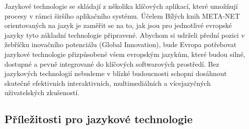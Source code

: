 \documentclass[]{../../metanetpaper}
\begin{document}
\begin{multicols}{2}
Jazykové technologie se skládají z několika klíčových aplikací, které umožňují procesy v rámci širšího aplikačního systému. Účelem Bílých knih META-NET orientovaných na jazyk je zaměřit se na to, jak jsou pro jednotlivé evropské jazyky tyto základní technologie připravené.
Abychom si udrželi přední pozici v žebříčku inovačního potenciálu (Global Innovation), bude Evropa potřebovat jazykové technologie přizpůsobené všem evropským jazykům, které budou silné, dostupné a pevně integrované do klíčových softwarových prostředí. Bez jazykových technologií nebudeme v blízké budoucnosti schopni dosáhnout skutečně efektivních interaktivních, multimediálních a vícejazyčných uživatelských zkušeností.

\subsection{Příležitosti pro jazykové technologie}


\end{multicols}
\end{document}
